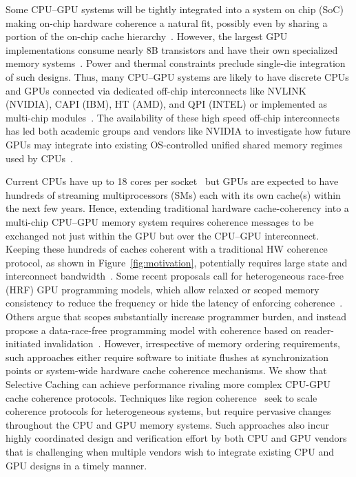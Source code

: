 Some CPU--GPU systems will be tightly integrated into a system on chip (SoC) making on-chip 
hardware coherence a natural fit, possibly even by sharing a portion of the on-chip 
cache hierarchy~\cite{HSA,AMDAPU,Hechtman2014}.  However, the largest GPU 
implementations consume nearly 8B transistors and have their own 
specialized memory systems~\cite{NVIDIA8BILLION}.  
Power and thermal constraints preclude single-die integration of such designs. 
Thus, many CPU--GPU systems are likely to have 
discrete CPUs and GPUs connected via dedicated off-chip interconnects like 
NVLINK (NVIDIA), CAPI (IBM), HT (AMD), and QPI (INTEL) or implemented as 
multi-chip modules~\cite{NVLINK,CAPI,AMDHT,INTELQPI,Chen92}. The availability of these
high speed off-chip interconnects has led both academic groups and vendors like NVIDIA
to investigate how future GPUs may integrate into existing OS-controlled 
unified shared memory regimes used by CPUs~\cite{Pichai2014,power2014,Agarwal2015,Agarwal2015b}.

Current CPUs have up to 18 cores per socket~\cite{INTELXEONE5V3} but GPUs are 
expected to have hundreds of streaming multiprocessors (SMs) each with its own cache(s) within 
the next few years. Hence, extending traditional hardware cache-coherency into a multi-chip 
CPU--GPU memory system requires coherence messages to be exchanged not just within the GPU but
over the CPU--GPU interconnect. Keeping these hundreds of caches coherent with a traditional HW
coherence protocol, as shown in
Figure~\ref{fig:motivation}, potentially requires large state and interconnect 
bandwidth~\cite{Kelm2010,johnson2011}. 
Some recent proposals call for heterogeneous race-free (HRF) GPU programming models, which
allow relaxed or scoped memory consistency to reduce the frequency or hide the
latency of enforcing coherence~\cite{Hechtman2014}. 
Others argue that scopes substantially increase programmer burden, and instead propose
a data-race-free programming model with coherence based on reader-initiated invalidation~\cite{Sinclair2015}.
However, irrespective of 
memory ordering requirements, such approaches either require software to initiate flushes
at synchronization points or system-wide hardware cache coherence mechanisms.
We show
that Selective Caching can achieve performance rivaling
more complex CPU-GPU cache coherence protocols.
Techniques like region coherence~\cite{Power2013} 
seek to scale coherence protocols for heterogeneous systems, but require
pervasive changes throughout the CPU and GPU memory systems. Such approaches
also incur highly coordinated design and verification effort by both CPU and GPU
vendors~\cite{Hong2012} that is challenging when multiple vendors wish to integrate
existing CPU and GPU designs in a timely manner.

